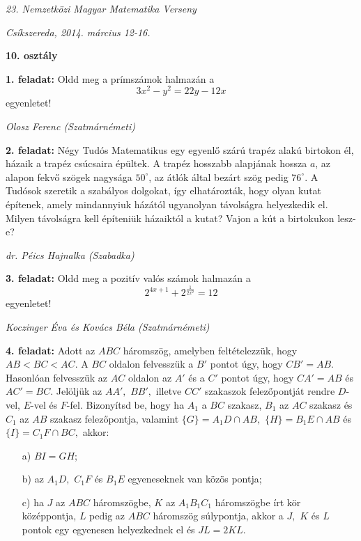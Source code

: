 \documentclass[a4paper,10pt]{article}
\newcommand{\ki}[2]{\hfill {\it #1 (#2)}\medskip}
\begin{document}
\begin{center} \Large {\em 23. Nemzetközi Magyar Matematika Verseny} \end{center}
\begin{center} \large{\em Csíkszereda, 2014. március 12-16.} \end{center}
\smallskip
\begin{center} \large{\bf 10. osztály} \end{center}
\bigskip

{\bf 1. feladat: } Oldd meg a prímszámok halmazán a $$
3x^{2}-y^{2}=22y-12x$$ egyenletet!


\ki{Olosz Ferenc}{Szatmárnémeti}\medskip

{\bf 2. feladat: } Négy Tudós Matematikus egy egyenlő szárú trapéz alakú birtokon
él, házaik a trapéz csúcsaira épültek. A trapéz hosszabb alapjának
hossza $a$, az alapon fekvő szögek nagysága $50^\circ $, az átlók
által bezárt szög pedig $76^\circ$. A Tudósok szeretik a szabályos
dolgokat, így elhatározták, hogy olyan kutat építenek, amely
mindannyiuk házától ugyanolyan távolságra helyezkedik el. Milyen
távolságra kell építeniük házaiktól a kutat? Vajon a kút a
birtokukon lesz-e?


\ki{dr. Péics Hajnalka}{Szabadka}\medskip

{\bf 3. feladat: } Oldd meg a pozitív valós számok halmazán a $$
\displaystyle 2^{4x+1}+2^{\frac{1}{2x^{2}}}=12 $$
 egyenletet!

\ki{Koczinger Éva és Kovács Béla}{Szatmárnémeti}\medskip

{\bf 4. feladat: } Adott az $ABC$ háromszög, amelyben feltételezzük, hogy $AB < BC <
AC$. A $BC$ oldalon felvesszük a $B'$ pontot úgy, hogy $CB'=AB.$
Hasonlóan felvesszük az $AC$ oldalon az $A'$ és a $C'$ pontot
úgy, hogy $CA'=AB$ és $AC'=BC.$ Jelöljük az $AA',$ $BB',$
illetve $CC'$ szakaszok felezőpontját rendre $D$-vel, $E$-vel
és $F$-fel. Bizonyítsd be, hogy ha ${A_1}$ a $BC$ szakasz,
${B_1}$ az $AC$ szakasz és ${C_1}$ az $AB$ szakasz felezőpontja,
valamint $\{G\}=A_1D\cap AB,$ $\{H\}=B_1E\cap AB$ és
$\{I\}=C_1F\cap BC,$ akkor:
\begin{itemize}
\item[a)] $BI=GH$; \item[b)] az ${A_1}D,$ ${C_1}F$ és ${B_1}E$
egyeneseknek van közös pontja; \item[c)] ha $J$ az $ABC$
háromszögbe, $K$ az ${A_1}{B_1}{C_1}$ háromszögbe írt kör
középpontja, $L$ pedig az $ABC$ háromszög súlypontja, akkor a $J,$
$K$ és $L$ pontok egy egyenesen helyezkednek el és $JL = 2KL.$
\end{itemize}
\end{document}

